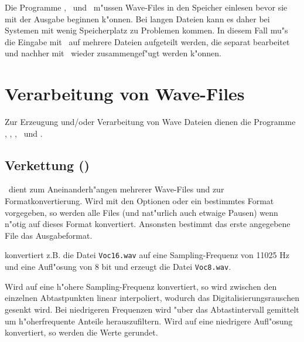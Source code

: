 Die Programme \wflt, \wmix\ und \wview\ m"ussen Wave-Files in den
Speicher einlesen bevor sie mit der Ausgabe beginnen k"onnen.
Bei langen Dateien kann es daher bei Systemen mit wenig 
Speicherplatz zu Problemen kommen. In diesem Fall mu"s die 
Eingabe mit \wcut\ auf mehrere Dateien aufgeteilt werden, die
separat bearbeitet und nachher mit \wcat\ wieder zusammengef"ugt
werden k"onnen.



\section{Verarbeitung von Wave-Files}

Zur Erzeugung und/oder Verarbeitung von Wave Dateien dienen die 
Programme \wcat , \wcut , \wmix , \wflt\ und \wfct . 


\subsection{Verkettung (\wcat)}



\wcat\ dient zum Aneinanderh"angen mehrerer Wave-Files und zur
Formatkonvertierung. Wird mit den Optionen  oder 
ein bestimmtes Format vorgegeben, so werden alle Files (und 
nat"urlich auch etwaige Pausen) wenn n"otig auf dieses Format 
konvertiert. Ansonsten bestimmt das erste angegebene File das
Ausgabeformat.


\noindent konvertiert z.B. die Datei {\tt Voc16.wav} auf eine 
Sampling-Frequenz von 11025 Hz und eine Aufl"osung von 8 bit und 
erzeugt die Datei {\tt Voc8.wav}.

Wird auf eine h"ohere Sampling-Frequenz konvertiert, so wird 
zwischen den einzelnen Abtastpunkten linear interpoliert, wodurch
das Digitalisierungsrauschen gesenkt wird. Bei niedrigeren
Frequenzen wird "uber das Abtastintervall gemittelt um 
h"oherfrequente Anteile herauszufiltern.
Wird auf eine niedrigere Aufl"osung konvertiert, so werden die
Werte gerundet.

